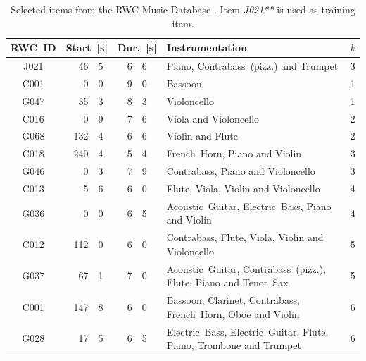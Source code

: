 \begin{table}[htb]
\center
\small
\begin{tabular}{cr@{.}lr@{.}lp{6cm}c}
\toprule[1.5pt]
RWC~ID & \multicolumn{2}{c}{Start~[s]} & \multicolumn{2}{c}{Dur.~[s]} & Instrumentation & \(k\)\\
\midrule
J021 & 46 & 5 & 6 & 6 & Piano, Contrabass~(pizz.) and Trumpet & 3\\
\hline
C001 & 0&0 & 9&0 & Bassoon & 1  \\
G047 & 35&3 & 8&3 & Violoncello & 1 \\
\hline
C016 & 0&9 & 7&6 & Viola and Violoncello & 2\\
G068 & 132&4 & 6&6 & Violin and Flute &  2\\
\hline
C018 & 240&4 & 5&4 & French~Horn, Piano and Violin & 3\\
G046 & 0&3 & 7&9 & Contrabass, Piano and Violoncello & 3\\
\hline
C013 & 5&6 & 6&0 & Flute, Viola, Violin and Violoncello & 4\\
G036 & 0&0 & 6&5 &  Acoustic~Guitar, Electric~Bass, Piano  and Violin & 4\\
\hline
C012 & 112&0 & 6&0 & Contrabass, Flute, Viola, Violin and  Violoncello & 5\\
G037 & 67&1 & 7&0 & Acoustic~Guitar, Contrabass~(pizz.), Flute, Piano and Tenor~Sax & 5\\
\hline
C001 & 147&8 & 6&0 & Bassoon, Clarinet, Contrabass, French~Horn, Oboe and Violin & 6\\
G028 & 17&5 & 6&5 & Electric~Bass, Electric~Guitar, Flute, Piano, Trombone and Trumpet & 6\\
\bottomrule[1.5pt]
\end{tabular}
\caption{Selected items from the RWC Music Database \cite{rwc}. Item \emph{J021**} is used as training item.}
\label{tab:items}
\end{table}


